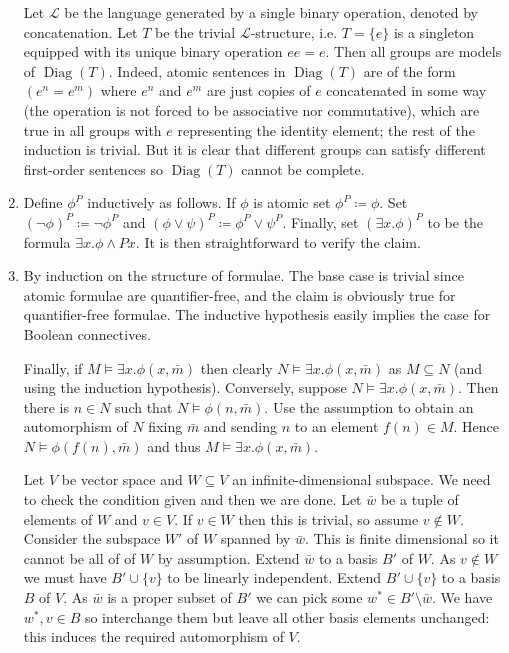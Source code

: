 \documentclass{article}
\DeclareMathOperator{\Diag}{Diag}
\begin{document}
\begin{enumerate}[leftmargin=*]
		Let $\mathcal{L}$ be the language generated by a single binary operation, denoted by concatenation. Let $T$ be the trivial $\mathcal{L}$-structure, i.e. $T = \{e\}$ is a singleton equipped with its unique binary operation $ee = e$. Then all groups are models of $\Diag(T)$. Indeed, atomic sentences in $\Diag(T)$ are of the form $(e^n = e^m)$ where $e^n$ and $e^m$ are just copies of $e$ concatenated in some way (the operation is not forced to be associative nor commutative), which are true in all groups with $e$ representing the identity element; the rest of the induction is trivial. But it is clear that different groups can satisfy different first-order sentences so $\Diag(T)$ cannot be complete.
		
		\item Define $\phi^P$ inductively as follows. If $\phi$ is atomic set $\phi^P \coloneqq \phi$. Set $(\neg\phi)^P \coloneqq \neg\phi^P$ and $(\phi \vee \psi)^P \coloneqq \phi^P \vee \psi^P$. Finally, set $(\exists x. \phi)^P$ to be the formula $\exists x. \phi \wedge Px$. It is then straightforward to verify the claim.
		
		\item By induction on the structure of formulae. The base case is trivial since atomic formulae are quantifier-free, and the claim is obviously true for quantifier-free formulae. The inductive hypothesis easily implies the case for Boolean connectives. 
		
		Finally, if $M \models \exists x. \phi(x,\bar{m})$ then clearly $N \models \exists x. \phi(x,\bar{m})$ as $M\subseteq N$ (and using the induction hypothesis). Conversely, suppose $N \models \exists x. \phi(x,\bar{m})$. Then there is $n\in N$ such that $N \models \phi(n,\bar{m})$. Use the assumption to obtain an automorphism of $N$ fixing $\bar{m}$ and sending $n$ to an element $f(n)\in M$. Hence $N \models \phi (f(n),\bar{m})$ and thus $M \models \exists x. \phi(x,\bar{m})$.
		
		Let $V$ be vector space and $W\subseteq V$ an infinite-dimensional subspace. We need to check the condition given and then we are done. Let $\bar{w}$ be a tuple of elements of $W$ and $v\in V$. If $v\in W$ then this is trivial, so assume $v\notin W$. Consider the subspace $W'$ of $W$ spanned by $\bar{w}$. This is finite dimensional so it cannot be all of of $W$ by assumption. Extend $\bar{w}$ to a basis $B'$ of $W$. As $v\notin W$ we must have $B'\cup\{v\}$ to be linearly independent. Extend $B'\cup\{v\}$ to a basis $B$ of $V$. As $\bar{w}$ is a proper subset of $B'$ we can pick some $w^*\in B' \setminus \bar{w}$. We have $w^*, v\in B$ so interchange them but leave all other basis elements unchanged: this induces the required automorphism of $V$.
		

\end{enumerate}
\end{document}
